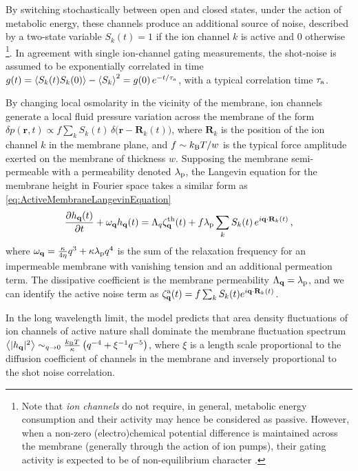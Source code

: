 \documentclass[graybox]{svmult}
\begin{document}
		By switching stochastically between open and closed states, under the action of metabolic energy, these channels produce an additional source of noise, described by a two-state variable $S_k(t)=1$ if the ion channel $k$ is active and $0$ otherwise \footnote{Note that \textit{ion channels} do not require,  in general, metabolic energy consumption and their activity may hence be considered as passive. However, when a non-zero (electro)chemical potential difference is maintained across the membrane (generally through the action of ion pumps), their gating activity is expected to be of non-equilibrium character \cite{Gadsby:2009}.}. In agreement with single ion-channel gating measurements, the shot-noise is assumed to be exponentially correlated in time $g(t) = \left\langle S_k(t)S_k(0) \right\rangle - \left\langle S_k \right\rangle^2 = g(0)\,e^{-t/\tau_{\rm{a}}}$, with a typical correlation time $\tau_{\rm{a}}$. 
		
		By changing local osmolarity in the vicinity of the membrane, ion channels generate a local fluid pressure variation across the membrane of the form $\delta p(\mathbf{r},t) \propto f\sum_k S_k(t)\,\delta\big(\mathbf{r}-\mathbf{R}_k(t)\big)$, where $\mathbf{R}_k$ is the position of the ion channel $k$ in the membrane plane, and $f \sim k_{\rm{B}}T/w$ is the typical force amplitude exerted on the membrane of thickness $w$. Supposing the membrane semi-permeable with a permeability denoted $\lambda_{\rm{p}}$, the Langevin equation for the membrane height in Fourier space takes a similar form as \eqref{eq:ActiveMembraneLangevinEquation}
\begin{equation}
	\label{eq:Prost1996_LangevinDynamics}	
	\frac{\partial h_{\mathbf{q}}(t)}{\partial t} + \omega_{\mathbf{q}}h_{\mathbf{q}}(t) = \Lambda_q\zeta^{\rm{th}}_{\mathbf{q}}(t) + f\lambda_{\rm{p}}\sum_k S_k(t)\,e^{i\mathbf{q}\cdot\mathbf{R}_k(t)}
	\,\textrm{,}
\end{equation}
where $\omega_{\mathbf{q}} = \frac{\kappa}{4\eta}q^3 + \kappa\lambda_{\rm{p}}q^4$ is the sum of the relaxation frequency for an impermeable membrane with vanishing tension and an additional permeation term. The dissipative coefficient is the membrane permeability $\Lambda_{\mathbf{q}} = \lambda_{\rm{p}}$, and we can identify the active noise term as $\zeta_{\mathbf{q}}^{\rm{a}} (t) = f\sum_k S_k(t)e^{i\mathbf{q}\cdot\mathbf{R}_k(t)}$.

In the long wavelength limit, the model predicts that area density fluctuations of ion channels of active nature shall dominate the membrane fluctuation spectrum $\left\langle |h_{\mathbf{q}}|^2 \right\rangle \sim_{q\rightarrow 0} \frac{k_{\rm{B}}T}{\kappa}\left(q^{-4} + \xi^{-1}q^{-5}\right)$, where $\xi$ is a length scale proportional to the diffusion coefficient of channels in the membrane and inversely proportional to the shot noise correlation.
\end{document}
